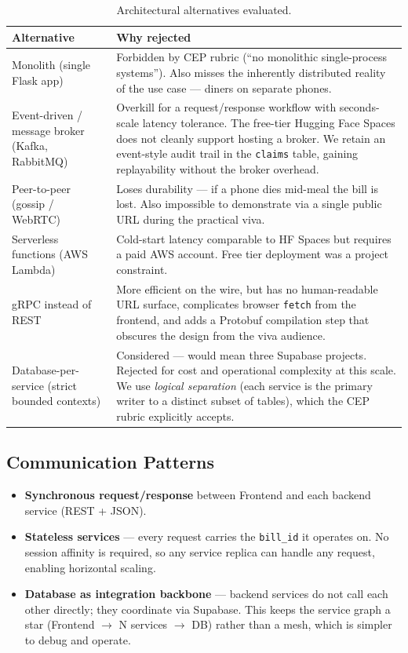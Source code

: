 \documentclass[11pt, a4paper]{article}
\begin{document}
\begin{table}[h!]
\centering
\caption{Architectural alternatives evaluated.}
\begin{tabularx}{\textwidth}{l X}
\toprule
\textbf{Alternative} & \textbf{Why rejected} \\
\midrule
Monolith (single Flask app)
& Forbidden by CEP rubric (``no monolithic single-process systems''). Also misses the inherently distributed reality of the use case --- diners on separate phones. \\
\addlinespace
Event-driven / message broker (Kafka, RabbitMQ)
& Overkill for a request/response workflow with seconds-scale latency tolerance. The free-tier Hugging Face Spaces does not cleanly support hosting a broker. We retain an event-style audit trail in the \texttt{claims} table, gaining replayability without the broker overhead. \\
\addlinespace
Peer-to-peer (gossip / WebRTC)
& Loses durability --- if a phone dies mid-meal the bill is lost. Also impossible to demonstrate via a single public URL during the practical viva. \\
\addlinespace
Serverless functions (AWS Lambda)
& Cold-start latency comparable to HF Spaces but requires a paid AWS account. Free tier deployment was a project constraint. \\
\addlinespace
gRPC instead of REST
& More efficient on the wire, but has no human-readable URL surface, complicates browser \texttt{fetch} from the frontend, and adds a Protobuf compilation step that obscures the design from the viva audience. \\
\addlinespace
Database-per-service (strict bounded contexts)
& Considered --- would mean three Supabase projects. Rejected for cost and operational complexity at this scale. We use \textit{logical separation} (each service is the primary writer to a distinct subset of tables), which the CEP rubric explicitly accepts. \\
\bottomrule
\end{tabularx}
\end{table}

\subsection{Communication Patterns}

\begin{itemize}[leftmargin=*]
\item \textbf{Synchronous request/response} between Frontend and each backend service (REST + JSON).
\item \textbf{Stateless services} --- every request carries the \texttt{bill\_id} it operates on. No session affinity is required, so any service replica can handle any request, enabling horizontal scaling.
\item \textbf{Database as integration backbone} --- backend services do not call each other directly; they coordinate via Supabase. This keeps the service graph a star (Frontend $\rightarrow$ N services $\rightarrow$ DB) rather than a mesh, which is simpler to debug and operate.
\end{itemize}
\end{document}
